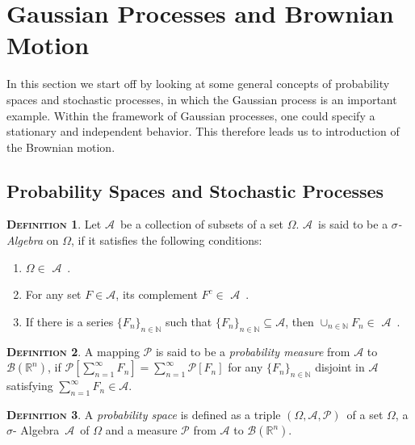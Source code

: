 \documentclass[a4paper, twoside, 11pt]{article}
\theoremstyle{definition}
\newtheorem{definition}{\scshape Definition}[section]
\def\AA{$\mathscr{A}$\ }
\newcommand{\compl}[1]{{#1}^{c}}
\def\sa{$\sigma$- Algebra\ }
\def\bs{$(\Omega, \mathscr{A}, \mathcal{P})$\ }
\def\bsigma{\mathscr{B}\brkt{\mathbb{R}^{n}}}
\newcommand{\sqbr}[1]{\left[ {#1} \right]}
\newcommand{\brkt}[1]{\left({#1} \right)}
\begin{document}
\newpage

\section{Gaussian Processes and Brownian Motion}
\setcounter{equation}{0}
In this section we start off by looking at some general concepts of probability spaces and stochastic processes, in which the Gaussian process is  an important example. Within the framework of Gaussian processes, one could specify a stationary and independent behavior. This therefore leads us to introduction of the Brownian motion.

\subsection{Probability Spaces and Stochastic Processes }
\begin{definition}
  Let \AA be a collection of subsets of a set $\Omega$. \AA is said to be a \emph{$\sigma$- Algebra} on $\Omega$, if it satisfies the following conditions:
  \begin{enumerate}[topsep=0pt, itemsep=-1ex, partopsep=1ex, parsep=1ex, label=(\roman*)]
	\item $\Omega \in $ \AA.
	\item For any set $F \in \mathscr{A}$, its complement $\compl{F} \in$ \AA.
	\item If there is a series $\{F_n\}_{n\in \mathbb{N}}$ such that $\{F_n\}_{n \in \mathbb{N}} \subseteq \mathscr{A}$, then $\cup_{n \in \mathbb{N}}F_n \in $ \AA.
  \end{enumerate}
\end{definition}

\begin{definition}
  A mapping $\mathcal{P}$ is said to be a \emph{probability measure} from $\mathscr{A}$ to $\bsigma$, if $\mathcal{P}\sqbr{\sum_{n=1}^{\infty} F_n} = \sum_{n=1}^{\infty} \mathcal{P}\sqbr{F_n}$ for any $\{F_n\}_{n \in \mathbb{N}}$ disjoint in $\mathscr{A}$ satisfying $\sum_{n=1}^{\infty}F_n \in \mathscr{A}$. 
\end{definition}

\begin{definition}
  A \emph{probability space} is defined as a triple \bs of a set $\Omega$, a \sa \AA  of $\Omega$ and a measure $\mathcal{P}$ from $\mathscr{A}$ to $\bsigma$.
\end{definition}
\end{document}
